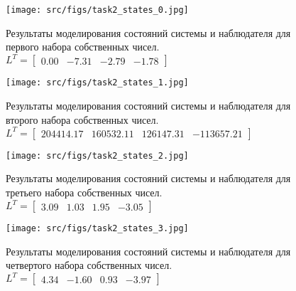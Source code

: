 \begin{figure}[ht!]
    \centering
    \texttt{[image: src/figs/task2\_states\_0.jpg]}
    \caption{Результаты моделирования состояний системы и наблюдателя для первого набора собственных чисел. \(L^T = \begin{bmatrix} 0.00 & -7.31 & -2.79 & -1.78 \end{bmatrix}\)}
    \label{fig:task2_states_1}
\end{figure}
\begin{figure}[ht!]
    \centering
    \texttt{[image: src/figs/task2\_states\_1.jpg]}
    \caption{Результаты моделирования состояний системы и наблюдателя для второго набора собственных чисел. \(L^T = \begin{bmatrix} 204414.17 &  160532.11 &  126147.31 & -113657.21 \end{bmatrix}\)}
    \label{fig:task2_states_2}
\end{figure}
\begin{figure}[ht!]
    \centering
    \texttt{[image: src/figs/task2\_states\_2.jpg]}
    \caption{Результаты моделирования состояний системы и наблюдателя для третьего набора собственных чисел. \(L^T = \begin{bmatrix} 3.09 &  1.03 &  1.95 & -3.05 \end{bmatrix}\)}
    \label{fig:task2_states_3}
\end{figure}
\begin{figure}[ht!]
    \centering
    \texttt{[image: src/figs/task2\_states\_3.jpg]}
    \caption{Результаты моделирования состояний системы и наблюдателя для четвертого набора собственных чисел. \(L^T = \begin{bmatrix} 4.34 & -1.60 &  0.93 & -3.97 \end{bmatrix}\)}
    \label{fig:task2_states_4}
\end{figure}

